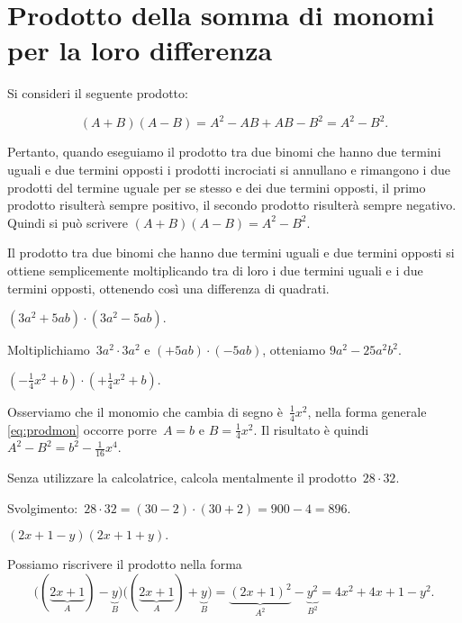 \ovalbox{\risolvii \ref{ese:12.11}, \ref{ese:12.12}, \ref{ese:12.13}, \ref{ese:12.14}, \ref{ese:12.15}}

\section{Prodotto della somma di monomi per la loro differenza}\label{sect:differenza_di_quadrati}

Si consideri il seguente prodotto:

\begin{equation}\label{eq:prodmon}
 \left(A+B\right)\left(A-B\right)=A^{2}-{AB}+{AB}-B^{2}=A^{2}-B^{2}.
\end{equation}

Pertanto, quando eseguiamo il prodotto tra due binomi che hanno due
termini uguali e due termini opposti i prodotti incrociati si annullano
e rimangono i due prodotti del termine uguale per se stesso e dei due
termini opposti, il primo prodotto risulterà sempre positivo, il
secondo prodotto risulterà sempre negativo. Quindi si può scrivere
$\left(A+B\right)\left(A-B\right)=A^{2}-B^{2}$.

\osservazione Il prodotto tra due binomi che hanno due termini
uguali e due termini opposti si ottiene semplicemente moltiplicando tra
di loro i due termini uguali e i due termini opposti, ottenendo così una differenza di quadrati.

\begin{exrig}
 \begin{esempio}
$\left(3a^{2}+5{ab}\right)\cdot \left(3a^{2}-5{ab}\right).$

Moltiplichiamo~$3a^{2}\cdot 3a^{2}$ e
$\left(+5{ab}\right)\cdot\left(-5{ab}\right)$, otteniamo
$9a^{2}-25a^{2}b^{2}$.
 \end{esempio}

 \begin{esempio}
 $\left(-{\frac{1}{4}}x^{2}+b\right)\cdot \left(+{\frac{1}{4}}x^{2}+b\right).$

Osserviamo che il monomio che cambia di segno è~$\frac{1}{4}x^{2}$,
nella forma generale \eqref{eq:prodmon} occorre porre~$A=b$ e $B=\frac{1}{4}x^{2}$.
Il risultato è quindi~$A^{2}-B^{2}=b^{2}-\frac{1}{16}x^{4}$.
 \end{esempio}

 \begin{esempio}
 Senza utilizzare la calcolatrice, calcola mentalmente il prodotto~$28\cdot 32$.

Svolgimento:~$28\cdot 32=(30-2)\cdot(30+2)=900-4=896$.
 \end{esempio}

 \begin{esempio}
$(2x+1-y)(2x+1+y).$

Possiamo riscrivere il prodotto nella forma
\[\big((\underbrace{2x+1}_{A})-\underbrace{y}_{B}\big)\big((\underbrace{2x+1}_{A})+\underbrace{y}_{B}\big)=\underbrace{(2x+1)^{2}}_{A^{2}}-\underbrace{y^{2}}_{B^{2}}=4x^{2}+4x+1-y^{2}.\]
 \end{esempio}

\end{exrig}

